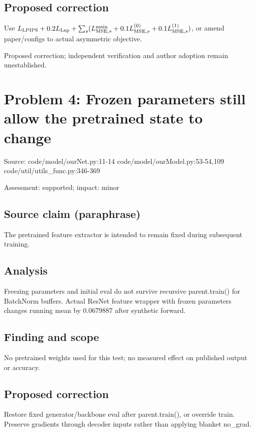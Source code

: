 \documentclass[11pt]{article}
\begin{document}
\subsection*{Proposed correction}

Use \(L_{\rm LPIPS}+0.2L_{\rm Lap}+\sum_s(L_{{\rm MSE},s}^{\rm main}+0.1L_{{\rm MSE},s}^{(0)}+0.1L_{{\rm MSE},s}^{(1)})\), or amend paper/configs to actual asymmetric objective.

Proposed correction; independent verification and author adoption remain unestablished.

\section*{Problem 4: Frozen parameters still allow the pretrained state to change}

Source: code/model/ourNet.py:11-14 code/model/ourModel.py:53-54,109 code/util/utils\_func.py:346-369

Assessment: supported; impact: minor

\subsection*{Source claim (paraphrase)}

The pretrained feature extractor is intended to remain fixed during subsequent training.

\subsection*{Analysis}

Freezing parameters and initial eval do not survive recursive parent.train() for BatchNorm buffers. Actual ResNet feature wrapper with frozen parameters changes running mean by \(0.0679887\) after synthetic forward.

\subsection*{Finding and scope}

No pretrained weights used for this test; no measured effect on published output or accuracy.

\subsection*{Proposed correction}

Restore fixed generator/backbone eval after parent.train(), or override train. Preserve gradients through decoder inputs rather than applying blanket no\_grad.
\end{document}
